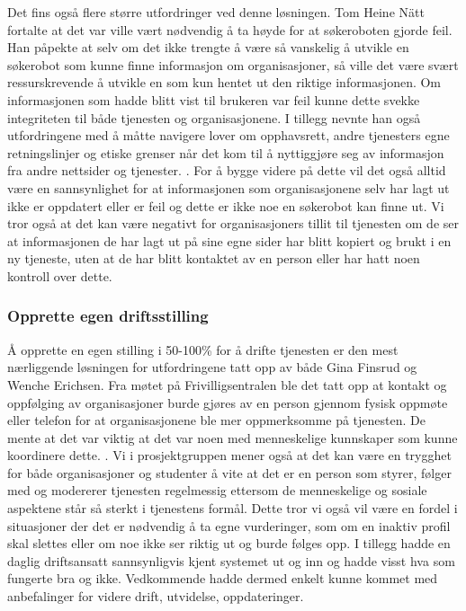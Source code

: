 Det fins også flere større utfordringer ved denne løsningen. Tom Heine Nätt fortalte at det var ville vært nødvendig å ta høyde for at søkeroboten gjorde feil. Han påpekte at selv om det ikke trengte å være så vanskelig å utvikle en søkerobot som kunne finne informasjon om organisasjoner, så ville det være svært ressurskrevende å utvikle en som kun hentet ut den riktige informasjonen. Om informasjonen som hadde blitt vist til brukeren var feil kunne dette svekke integriteten til både tjenesten og organisasjonene. I tillegg nevnte han også utfordringene med å måtte navigere lover om opphavsrett, andre tjenesters egne retningslinjer og etiske grenser når det kom til å nyttiggjøre seg av informasjon fra andre nettsider og tjenester. \cite{WEBCRAWLER-SAMTALE:23}. For å bygge videre på dette vil det også alltid være en sannsynlighet for at informasjonen som organisasjonene selv har lagt ut ikke er oppdatert eller er feil og dette er ikke noe en søkerobot kan finne ut. Vi tror også at det kan være negativt for organisasjoners tillit til tjenesten om de ser at informasjonen de har lagt ut på sine egne sider har blitt kopiert og brukt i en ny tjeneste, uten at de har blitt kontaktet av en person eller har hatt noen kontroll over dette.

\subsubsection{Opprette egen driftsstilling}
Å opprette en egen stilling i 50-100\% for å drifte tjenesten er den mest nærliggende løsningen for utfordringene tatt opp av både Gina Finsrud og Wenche Erichsen. Fra møtet på Frivilligsentralen ble det tatt opp at kontakt og oppfølging av organisasjoner burde gjøres av en person gjennom fysisk oppmøte eller telefon for at organisasjonene ble mer oppmerksomme på tjenesten. De mente at det var viktig at det var noen med menneskelige kunnskaper som kunne koordinere dette. \cite{FRIVILLIGSENTRALEN-INTERVJU:21}. Vi i prosjektgruppen mener også at det kan være en trygghet for både organisasjoner og studenter å vite at det er en person som styrer, følger med og modererer tjenesten regelmessig ettersom de menneskelige og sosiale aspektene står så sterkt i tjenestens formål. Dette tror vi også vil være en fordel i situasjoner der det er nødvendig å ta egne vurderinger, som om en inaktiv profil skal slettes eller om noe ikke ser riktig ut og burde følges opp. I tillegg hadde en daglig driftsansatt sannsynligvis kjent systemet ut og inn og hadde visst hva som fungerte bra og ikke. Vedkommende hadde dermed enkelt kunne kommet med anbefalinger for videre drift, utvidelse, oppdateringer.


